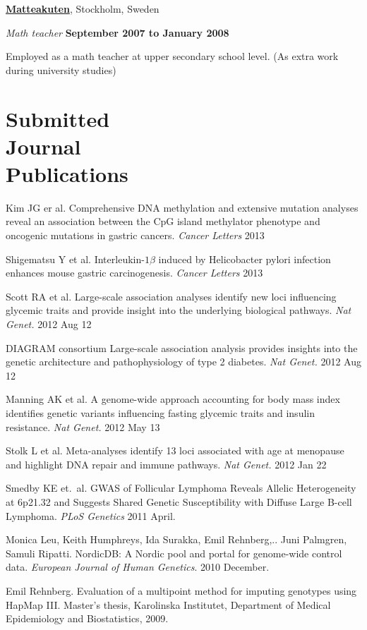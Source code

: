 \halfblankline

\href{http://www.matteakuten.se}{\textbf{Matteakuten}}, Stockholm, Sweden
\begin{outerlist}
\item[] \textit{Math teacher}%
  \hfill \textbf{September 2007 to January 2008}
  \begin{innerlist}
  \item Employed as a math teacher at upper secondary school level. (As extra work during university studies)
  \end{innerlist}

\end{outerlist}

%
%
\section{Submitted\\Journal\\Publications} \begin{bibsection}
\item Kim JG er al.
  Comprehensive DNA methylation and extensive mutation analyses reveal an association between the CpG island methylator phenotype and oncogenic mutations in gastric cancers.
  \emph{Cancer Letters} 2013
\item Shigematsu Y et al.
  Interleukin-$1\beta$ induced by Helicobacter pylori infection enhances mouse gastric carcinogenesis.
  \emph{Cancer Letters} 2013
\item Scott RA et al.
  Large-scale association analyses identify new loci influencing glycemic traits and provide insight into the underlying biological pathways.
  \emph{Nat Genet.} 2012 Aug 12
\item DIAGRAM consortium
  Large-scale association analysis provides insights into the genetic architecture and pathophysiology of type 2 diabetes.
  \emph{Nat Genet.} 2012 Aug 12
\item Manning AK et al.
  A genome-wide approach accounting for body mass index identifies genetic variants influencing fasting glycemic traits and insulin resistance.
  \emph{Nat Genet.} 2012 May 13
\item Stolk L et al.
  Meta-analyses identify 13 loci associated with age at menopause and highlight DNA repair and immune pathways.
  \emph{Nat Genet.} 2012 Jan 22
\item Smedby KE et.\ al.
  GWAS of Follicular Lymphoma Reveals Allelic Heterogeneity at 6p21.32 and Suggests Shared Genetic Susceptibility with Diffuse Large B-cell Lymphoma.
  \emph{PLoS Genetics} 2011 April.
\item Monica Leu, Keith Humphreys, Ida Surakka, Emil Rehnberg,.. Juni Palmgren, Samuli Ripatti.
  NordicDB: A Nordic pool and portal for genome-wide control data.
  \emph{European Journal of Human Genetics}. 2010 December.
\item Emil Rehnberg.
  Evaluation of a multipoint method for imputing genotypes using HapMap III\@.
  Master’s thesis, Karolinska Institutet, Department of Medical Epidemiology and Biostatistics, 2009.
\end{bibsection}

